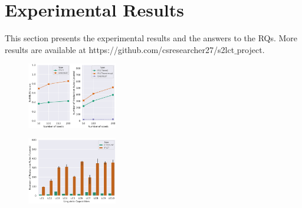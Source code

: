 \section{Experimental Results}
\label{sec:result}

This section presents the experimental results and the answers to the RQs. More results are available at https://github.com/csresearcher27/s2lct$\_$project.



\begin{figure}
    \centering
    \includegraphics[width=0.35\textwidth]{figs/pdr-selfbleu-agg-lineplot.eps}
    \caption{\PdrSelfbleuFigCaption}
\end{figure}




\begin{figure}%
    \centering
    \includegraphics[width=0.35\textwidth]{figs/pdr-ours-50seeds-barplot.eps}
    \caption{\PdrBarplotFigCaption}
\end{figure}


